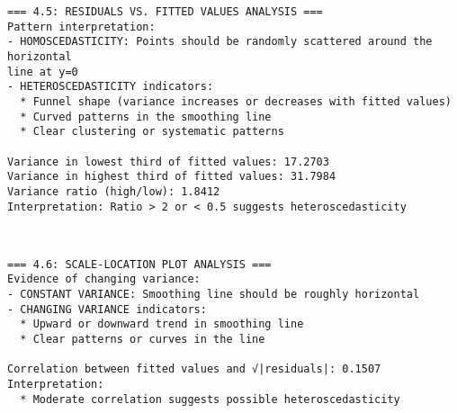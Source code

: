 \documentclass[11pt, twocolumn]{article}
\begin{document}
    \begin{Verbatim}[commandchars=\\\{\}]
=== 4.5: RESIDUALS VS. FITTED VALUES ANALYSIS ===
Pattern interpretation:
- HOMOSCEDASTICITY: Points should be randomly scattered around the horizontal
line at y=0
- HETEROSCEDASTICITY indicators:
  * Funnel shape (variance increases or decreases with fitted values)
  * Curved patterns in the smoothing line
  * Clear clustering or systematic patterns

Variance in lowest third of fitted values: 17.2703
Variance in highest third of fitted values: 31.7984
Variance ratio (high/low): 1.8412
Interpretation: Ratio > 2 or < 0.5 suggests heteroscedasticity

    \end{Verbatim}

    \begin{center}
    \end{center}
    { \hspace*{\fill} \\}
    
    \begin{Verbatim}[commandchars=\\\{\}]
=== 4.6: SCALE-LOCATION PLOT ANALYSIS ===
Evidence of changing variance:
- CONSTANT VARIANCE: Smoothing line should be roughly horizontal
- CHANGING VARIANCE indicators:
  * Upward or downward trend in smoothing line
  * Clear patterns or curves in the line

Correlation between fitted values and √|residuals|: 0.1507
Interpretation:
  * Moderate correlation suggests possible heteroscedasticity

    \end{Verbatim}

    \begin{center}
    \end{center}
    { \hspace*{\fill} \\}
    
\end{document}
